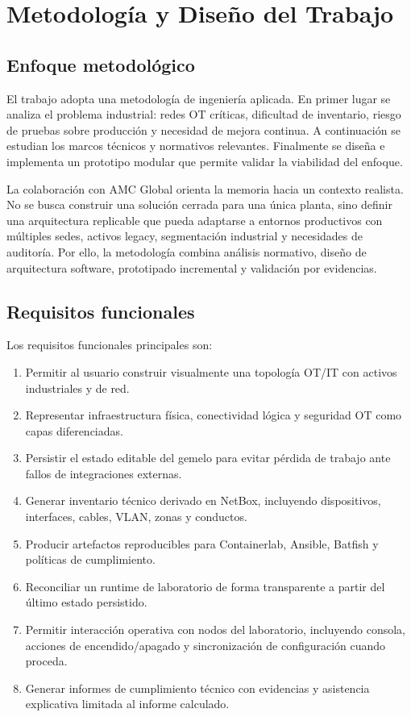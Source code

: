 \chapter{Metodología y Diseño del Trabajo} \label{ch:metodologia}

\section{Enfoque metodológico} \label{sec:enfoque-metodologico}

El trabajo adopta una metodología de ingeniería aplicada. En primer lugar se analiza el problema industrial: redes OT críticas, dificultad de inventario, riesgo de pruebas sobre producción y necesidad de mejora continua. A continuación se estudian los marcos técnicos y normativos relevantes. Finalmente se diseña e implementa un prototipo modular que permite validar la viabilidad del enfoque.

La colaboración con AMC Global orienta la memoria hacia un contexto realista. No se busca construir una solución cerrada para una única planta, sino definir una arquitectura replicable que pueda adaptarse a entornos productivos con múltiples sedes, activos legacy, segmentación industrial y necesidades de auditoría. Por ello, la metodología combina análisis normativo, diseño de arquitectura software, prototipado incremental y validación por evidencias.

\section{Requisitos funcionales} \label{sec:requisitos-funcionales}

Los requisitos funcionales principales son:

\begin{enumerate}[label=RF-\arabic*.]
    \item Permitir al usuario construir visualmente una topología OT/IT con activos industriales y de red.
    \item Representar infraestructura física, conectividad lógica y seguridad OT como capas diferenciadas.
    \item Persistir el estado editable del gemelo para evitar pérdida de trabajo ante fallos de integraciones externas.
    \item Generar inventario técnico derivado en NetBox, incluyendo dispositivos, interfaces, cables, VLAN, zonas y conductos.
    \item Producir artefactos reproducibles para Containerlab, Ansible, Batfish y políticas de cumplimiento.
    \item Reconciliar un runtime de laboratorio de forma transparente a partir del último estado persistido.
    \item Permitir interacción operativa con nodos del laboratorio, incluyendo consola, acciones de encendido/apagado y sincronización de configuración cuando proceda.
    \item Generar informes de cumplimiento técnico con evidencias y asistencia explicativa limitada al informe calculado.
\end{enumerate}

